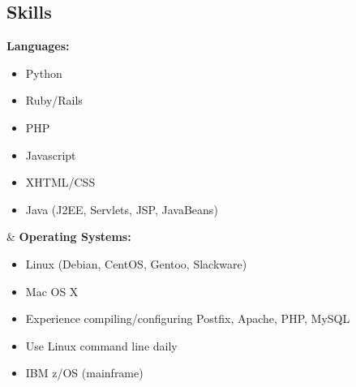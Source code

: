 \documentclass[]{res}
\begin{document}
\begin{resume}


\section{Skills}
\begin{ncolumn}{2}
  {\bf Languages:} 
  \begin{itemize}
  \item Python
  \item Ruby/Rails
  \item PHP
  \item Javascript
  \item XHTML/CSS
  \item Java (J2EE, Servlets, JSP, JavaBeans)
  \end{itemize}
&
  {\bf Operating Systems:} 
  \begin{itemize}
  \item Linux (Debian, CentOS, Gentoo, Slackware)
  \item Mac OS X
  \item Experience compiling/configuring Postfix, Apache, PHP, MySQL
  \item Use Linux command line daily
  \item IBM z/OS (mainframe)
  \end{itemize}
\end{ncolumn}


\end{resume}
\end{document}

